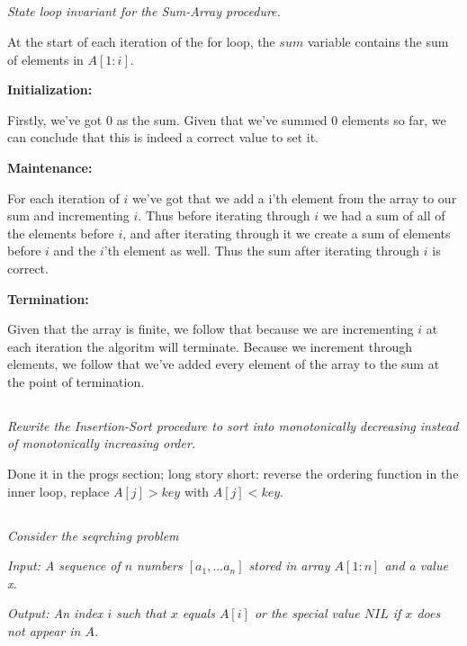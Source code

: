 \documentclass[11pt,oneside,titlepage]{book}
\begin{document}
\subsection{}

\textit{State loop invariant for the Sum-Array procedure.}

At the start of each iteration of the for loop, the $sum$ variable contains the sum of elements
in $A[1: i]$.

\textbf{Initialization: }

Firstly, we've got 0 as the sum. Given that we've summed 0 elements so far, we can conclude
that this is indeed a correct value to set it.

\textbf{Maintenance: }

For each iteration of $i$ we've got that we add a i'th element from the array to our sum and
incrementing $i$. Thus before iterating through $i$ we had a sum of all of the elements
before $i$, and after iterating through it we create a sum of elements before $i$ and
the $i$'th element as well. Thus the sum after iterating through $i$ is correct.

\textbf{Termination: }

Given that the array is finite, we follow that because we are incrementing $i$ at each
iteration the algoritm will terminate. Because we increment through elements, we follow that
we've added every element of the array to the sum at the point of termination.

\subsection{}

\textit{Rewrite the Insertion-Sort procedure to sort into monotonically decreasing instead
  of monotonically increasing order.}

Done it in the progs section; long story short: reverse the ordering function in the inner loop,
replace  $A[j] > key$ with $A[j] < key$.

\subsection{}

\textit{Consider the seqrching problem}

\textit{Input: A sequence of $n$ numbers $[a_1, ... a_n]$ stored in array $A[1:n]$ and a
  value x.}

\textit{Output: An index $i$ such that $x$ equals $A[i]$ or the special value $NIL$ if $x$
  does not appear in $A$.}
\end{document}
